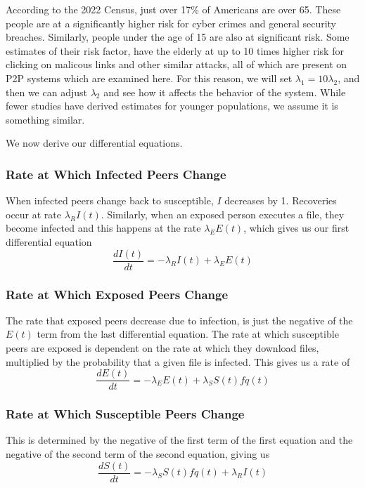 \documentclass[12pt, oneside]{article}
\begin{document}
        According to the 2022 Census, just over 17\% of Americans are over 65\cite{uscensus2022}. These people are at a significantly higher risk for 
        cyber crimes and general security breaches\cite{blackwood-brown2018}. Similarly, people under the age of 15 are also at significant risk. 
        Some estimates of their risk factor, have the elderly at up to 10 times higher
        risk for clicking on malicous links and other similar attacks, all of which are present on P2P systems which are examined here. For this reason, we will set
        $\lambda_1 = 10\lambda_2$, and then we can adjust $\lambda_2$ and see how it affects the behavior of the system. While fewer studies have derived estimates for
        younger populations, we assume it is something similar. 

        We now derive our differential equations.
        \subsubsection{Rate at Which Infected Peers Change}
        When infected peers change back to susceptible,  $I$ decreases by 1. Recoveries occur at rate  $\lambda_R I(t)$.
        Similarly, when an exposed person executes a file, they become infected and this happens at the rate $\lambda_E E(t)$, which
        gives us our first differential equation \[
        \frac{dI(t)}{dt}=-\lambda_R I(t)+\lambda_E E(t)
        \] 
        \subsubsection{Rate at Which Exposed Peers Change}
        The rate that exposed peers decrease due to infection, is just the negative of the $E(t)$ term from the last differential equation.
        The rate at which susceptible peers are exposed is dependent on the rate at which they download files, multiplied by the probability
        that a given file is infected. This gives us a rate of \[
            \frac{dE(t)}{dt}=-\lambda_E E(t)+\lambda_S S(t)f{q(t)}
        \]
        \subsubsection{Rate at Which Susceptible Peers Change}
        This is determined by the negative of the first term of the first equation and the negative of the second term of the second equation, giving us
        \[
            \frac{dS(t)}{dt}=-\lambda_S S(t)f{q(t)}+\lambda_R I(t)
        \]
\end{document}
